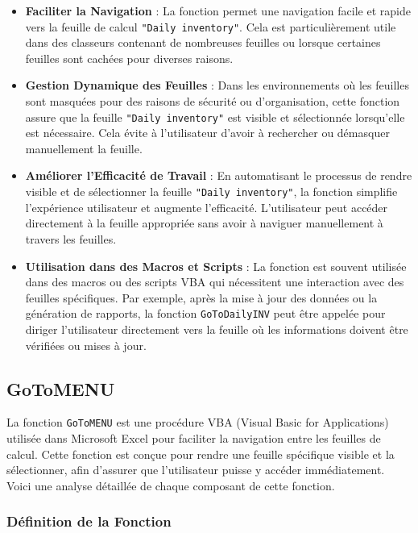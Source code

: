 \documentclass[a4paper, oneside, 12pt, final]{extreport}
\begin{document}
\begin{itemize}
    \item \textbf{Faciliter la Navigation} : La fonction permet une navigation facile et rapide vers la feuille de calcul \texttt{"Daily inventory"}. Cela est particulièrement utile dans des classeurs contenant de nombreuses feuilles ou lorsque certaines feuilles sont cachées pour diverses raisons.
    \item \textbf{Gestion Dynamique des Feuilles} : Dans les environnements où les feuilles sont masquées pour des raisons de sécurité ou d'organisation, cette fonction assure que la feuille \texttt{"Daily inventory"} est visible et sélectionnée lorsqu'elle est nécessaire. Cela évite à l'utilisateur d'avoir à rechercher ou démasquer manuellement la feuille.
    \item \textbf{Améliorer l'Efficacité de Travail} : En automatisant le processus de rendre visible et de sélectionner la feuille \texttt{"Daily inventory"}, la fonction simplifie l'expérience utilisateur et augmente l'efficacité. L'utilisateur peut accéder directement à la feuille appropriée sans avoir à naviguer manuellement à travers les feuilles.
    \item \textbf{Utilisation dans des Macros et Scripts} : La fonction est souvent utilisée dans des macros ou des scripts VBA qui nécessitent une interaction avec des feuilles spécifiques. Par exemple, après la mise à jour des données ou la génération de rapports, la fonction \texttt{GoToDailyINV} peut être appelée pour diriger l'utilisateur directement vers la feuille où les informations doivent être vérifiées ou mises à jour.
\end{itemize}
\subsection{GoToMENU}

La fonction \texttt{GoToMENU} est une procédure VBA (Visual Basic for Applications) utilisée dans Microsoft Excel pour faciliter la navigation entre les feuilles de calcul. Cette fonction est conçue pour rendre une feuille spécifique visible et la sélectionner, afin d'assurer que l'utilisateur puisse y accéder immédiatement. Voici une analyse détaillée de chaque composant de cette fonction.

\subsubsection{Définition de la Fonction}
\end{document}
